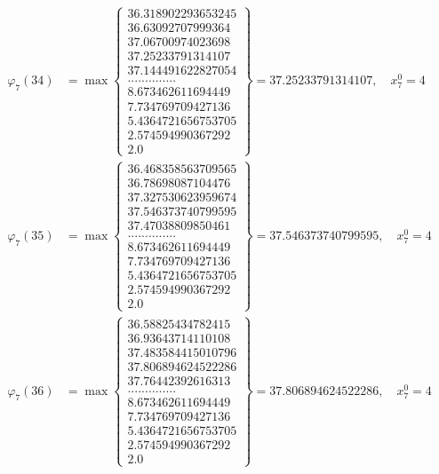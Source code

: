 \documentclass{article}
\begin{document}
\begin{align*}
  
  
  
\varphi_{7}(34) &= \max \left\{ \begin{array}{c}
36.318902293653245 \\
 36.63092707999364 \\
 37.06700974023698 \\
 37.25233791314107 \\
 37.144491622827054 \\
 .............. \\
 8.673462611694449 \\
 7.734769709427136 \\
 5.4364721656753705 \\
 2.574594990367292 \\
 2.0
\end{array} \right\} = 37.25233791314107, \quad x_{7}^0 = 4\\
  
  
  
  
\varphi_{7}(35) &= \max \left\{ \begin{array}{c}
36.468358563709565 \\
 36.78698087104476 \\
 37.327530623959674 \\
 37.546373740799595 \\
 37.47038809850461 \\
 .............. \\
 8.673462611694449 \\
 7.734769709427136 \\
 5.4364721656753705 \\
 2.574594990367292 \\
 2.0
\end{array} \right\} = 37.546373740799595, \quad x_{7}^0 = 4\\
  
  
  
  
\varphi_{7}(36) &= \max \left\{ \begin{array}{c}
36.58825434782415 \\
 36.93643714110108 \\
 37.483584415010796 \\
 37.806894624522286 \\
 37.76442392616313 \\
 .............. \\
 8.673462611694449 \\
 7.734769709427136 \\
 5.4364721656753705 \\
 2.574594990367292 \\
 2.0
\end{array} \right\} = 37.806894624522286, \quad x_{7}^0 = 4\\
  
  
\end{align*}
\end{document}
